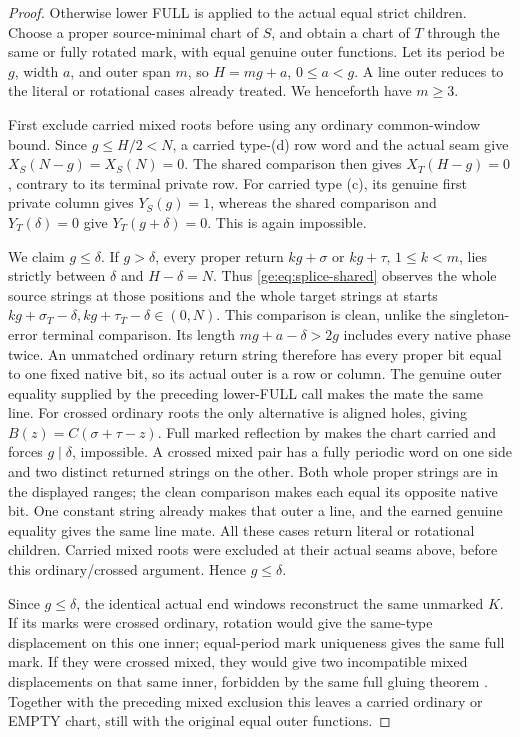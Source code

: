 \documentclass[11pt,a4paper]{amsart}
\numberwithin{equation}{section}
\theoremstyle{plain}
\theoremstyle{definition}
\begin{document}
\begin{proof}
Otherwise lower FULL is applied to the actual equal strict children.
Choose a proper source-minimal chart of \(S\), and obtain a chart of
\(T\) through the same or fully rotated mark, with equal genuine outer
functions.  Let its period be \(g\), width \(a\), and outer span
\(m\), so \(H=mg+a\), \(0\le a<g\).  A line outer reduces to
the literal or rotational cases already treated.  We henceforth have
\(m\ge3\).

First exclude carried mixed roots before using any ordinary common-window
bound.  Since \(g\le H/2<N\), a carried type-(d) row word and the
actual seam give
\(X_S(N-g)=X_S(N)=0\).  The shared comparison then gives
\(X_T(H-g)=0\), contrary to its terminal private row.  For carried
type (c), its genuine first private column gives \(Y_S(g)=1\),
whereas the shared comparison and \(Y_T(\delta)=0\) give
\(Y_T(g+\delta)=0\).  This is again impossible.

We claim \(g\le\delta\).  If \(g>\delta\), every proper return
\(kg+\sigma\) or \(kg+\tau\), \(1\le k<m\), lies strictly between
\(\delta\) and \(H-\delta=N\).
Thus \eqref{ge:eq:splice-shared} observes the whole source strings
at those positions and the whole target strings at starts
\(kg+\sigma_T-\delta,kg+\tau_T-\delta\in(0,N)\).
This comparison is clean, unlike the singleton-error terminal
comparison.  Its length \(mg+a-\delta>2g\) includes every native
phase twice.  An unmatched ordinary return string therefore has
every proper bit equal to one fixed native bit, so its actual
outer is a row or column.  The genuine outer equality supplied by
the preceding lower-FULL call makes the mate the same line.
For crossed ordinary roots the only alternative is aligned holes,
giving \(B(z)=C(\sigma+\tau-z)\).  Full marked reflection by
 makes the chart carried and forces
\(g\mid\delta\), impossible.  A crossed mixed pair has a fully
periodic word on one side and two distinct returned strings on the
other.  Both whole proper strings are in the displayed ranges;
the clean comparison makes each equal its opposite native bit.
One constant string already makes that outer a line, and the
earned genuine equality gives the same line mate.
All these cases return literal or rotational children.
Carried mixed roots were excluded at their actual seams above,
before this ordinary/crossed argument.  Hence \(g\le\delta\).

Since \(g\le\delta\), the identical actual end windows reconstruct
the same unmarked \(K\).  If its marks were crossed ordinary, rotation
would give the same-type displacement on this one inner; equal-period
mark uniqueness gives the same full mark.  If they were crossed mixed,
they would give two incompatible mixed displacements on that same inner,
forbidden by the same full gluing theorem
\cite[Equal-period comparison lemma]{Shields2026Gluing}.
Together with the preceding mixed exclusion this leaves a carried
ordinary or EMPTY chart, still with the original equal outer functions.


\end{proof}
\end{document}
